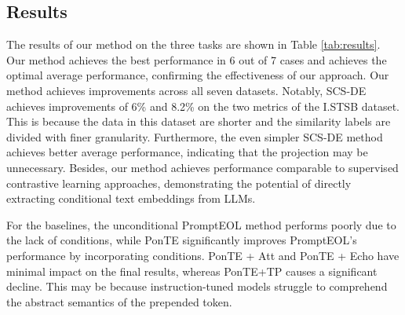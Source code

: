 \documentclass[11pt]{article}
\begin{document}
\subsection{Results}
The results of our method on the three tasks are shown in Table \ref{tab:results}.
Our method achieves the best performance in 6 out of 7 cases and achieves the optimal average performance, confirming the effectiveness of our approach.
Our method achieves improvements across all seven datasets.
Notably, SCS-DE achieves improvements of 6\% and 8.2\% on the two metrics of the I.STSB dataset.
This is because the data in this dataset are shorter and the similarity labels are divided with finer granularity.
Furthermore, the even simpler SCS-DE method achieves better average performance, indicating that the projection may be unnecessary.
Besides, our method achieves performance comparable to supervised contrastive learning approaches, demonstrating the potential of directly extracting conditional text embeddings from LLMs.

For the baselines, the unconditional PromptEOL method performs poorly due to the lack of conditions, while PonTE significantly improves PromptEOL's performance by incorporating conditions.
PonTE + Att and PonTE + Echo have minimal impact on the final results, whereas PonTE+TP causes a significant decline.
This may be because instruction-tuned models struggle to comprehend the abstract semantics of the prepended token.
\end{document}

